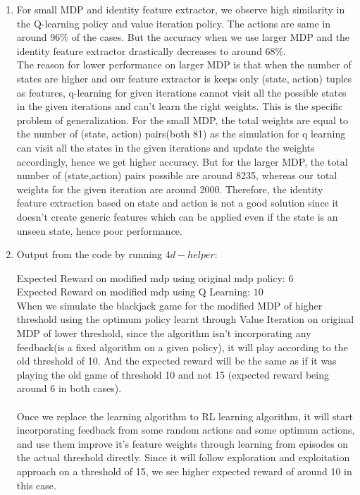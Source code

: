 \documentclass[12pt]{article}
\begin{document}
\begin{enumerate}[label=(\alph*)]
	\addtocounter{enumi}{1}
	\item For small MDP and identity feature extractor, we observe high similarity in the Q-learning policy and value iteration policy. The actions are same in around $96\%$ of the cases.  But the accuracy when we use larger MDP and the identity feature extractor drastically decreases to around $68\%$. \\
	The reason for lower performance on larger MDP is that when the number of states are higher and our feature extractor is keeps only (state, action) tuples as features, q-learning for given iterations cannot visit all the possible states in the given iterations and can't learn the right weights. This is the specific problem of generalization. For the small MDP, the total weights are equal to the number of (state, action) pairs(both 81) as the simulation for q learning can visit all the states in the given iterations and update the weights accordingly, hence we get higher accuracy. But for the larger MDP, the total number of (state,action) pairs possible are around 8235, whereas our total weights for the given iteration are around 2000. Therefore, the identity feature extraction based on state and action is not a good solution since it doesn't create generic features which can be applied even if the state is an unseen state, hence poor performance.
	\addtocounter{enumi}{1}
	\item Output from the code by running $4d-helper$:
	
	Expected Reward on modified mdp using original mdp policy: $6$ \\
	Expected Reward on modified mdp using Q Learning: $10$ \\
	
	When we simulate the blackjack game for the modified MDP of higher threshold using the optimum policy learnt through Value Iteration on original MDP of lower threshold, since the algorithm isn't incorporating any feedback(is a fixed algorithm on a given policy), it will play according to the old threshold of 10. And the expected reward will be the same as if it was playing the old game of threshold 10 and not 15 (expected reward being around 6 in both cases). \\ \\
	Once we replace the learning algorithm to RL learning algorithm, it will start incorporating feedback from some random actions and some optimum actions, and use them improve it's feature weights through learning from episodes on the actual threshold directly. Since it will follow exploration and exploitation approach on a threshold of 15, we see higher expected reward of around 10 in this case.
\end{enumerate}
\end{document}
